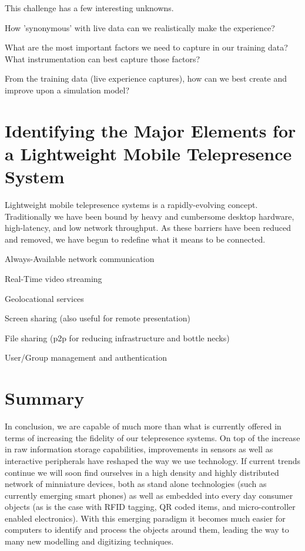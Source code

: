 \documentclass[a4paper,12pt]{report}
\begin{document}
This challenge has a few interesting unknowns.

How 'synonymous' with live data can we realistically make the experience?

What are the most important factors we need to capture in our training data? What instrumentation can best capture those factors?

From the training data (live experience captures), how can we best create and improve upon a simulation model?\cite{391769} 

\section{Identifying the Major Elements for a Lightweight Mobile Telepresence System}

Lightweight mobile telepresence systems is a rapidly-evolving concept. Traditionally we have been bound by heavy and cumbersome desktop hardware, high-latency, and low network throughput. As these barriers have been reduced and removed, we have begun to redefine what it means to be connected.

Always-Available network communication

Real-Time video streaming

Geolocational services

Screen sharing (also useful for remote presentation)

File sharing (p2p for reducing infrastructure and bottle necks)

User/Group management and authentication

\section{Summary}

In conclusion, we are capable of much more than what is currently offered in terms of increasing the fidelity of our telepresence systems. On top of the increase in raw information storage capabilities, improvements in sensors as well as interactive peripherals have reshaped the way we use technology. If current trends continue we will soon find ourselves in a high density and highly distributed network of minniature devices, both as stand alone technologies (such as currently emerging smart phones) as well as embedded into every day consumer objects (as is the case with RFID tagging, QR coded items, and micro-controller enabled electronics). With this emerging paradigm it becomes much easier for computers to identify and process the objects around them, leading the way to many new modelling and digitizing techniques.
\end{document}
